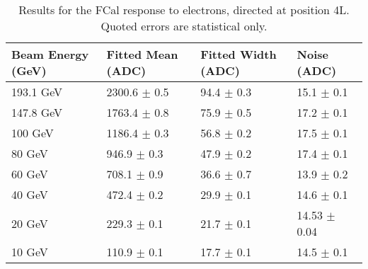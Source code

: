 \begin{table}[p]
\begin{center}
\begin{tabular}{|l|l|l|l|}
\hline
Beam Energy (GeV) & Fitted Mean (ADC)& Fitted Width (ADC)& Noise (ADC) \\
\hline
193.1 GeV  &  2300.6 $\pm$     0.5 &    94.4 $\pm$     0.3 &    15.1 $\pm$     0.1 \\
147.8 GeV  &  1763.4 $\pm$     0.8 &    75.9 $\pm$     0.5 &    17.2 $\pm$     0.1 \\
100 GeV  &  1186.4 $\pm$     0.3 &    56.8 $\pm$     0.2 &    17.5 $\pm$     0.1 \\
80 GeV  &   946.9 $\pm$     0.3 &    47.9 $\pm$     0.2 &    17.4 $\pm$     0.1 \\
60 GeV  &   708.1 $\pm$     0.9 &    36.6 $\pm$     0.7 &    13.9 $\pm$     0.2 \\
40 GeV  &   472.4 $\pm$     0.2 &    29.9 $\pm$     0.1 &    14.6 $\pm$     0.1 \\
20 GeV  &   229.3 $\pm$     0.1 &    21.7 $\pm$     0.1 &    14.53 $\pm$     0.04 \\
10 GeV  &   110.9 $\pm$     0.1 &    17.7 $\pm$     0.1 &    14.5 $\pm$     0.1 \\
\hline
\end{tabular}
\end{center}
\caption{Results for the FCal response to electrons, directed at position 4L. Quoted errors are statistical only.}
\label{TBres_table_elec_4L}
\end{table}

